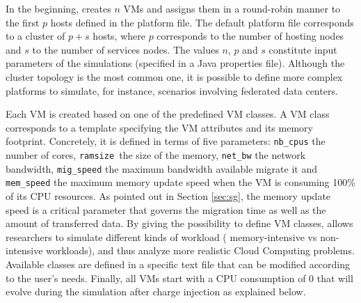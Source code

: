 In the beginning, \vmps creates $n$ VMs and assigns them in a
round-robin manner to the first $p$ hosts defined in the platform
file.  The default platform file corresponds to a cluster of $p+s$
hosts, where $p$ corresponds to the number of hosting nodes and $s$ to
the number of services nodes. The values $n$, $p$ and $s$ constitute
input parameters of the simulations (specified in a Java properties
file).
Although the cluster topology is the most
common one, it is possible to define more complex platforms to simulate,
for instance, scenarios involving federated data centers.

Each VM is created based on one of the predefined VM classes. A VM
class corresponds to a template specifying the VM attributes and its
memory footprint. Concretely, it is
defined in terms of five parameters:
\texttt{nb\_cpus}  the number of cores, \texttt{ramsize }the size of
the memory, \texttt{net\_bw} the
network bandwidth, \texttt{mig\_speed} the maximum
bandwidth available migrate it and \texttt{mem\_speed} the maximum
memory update speed when the VM is consuming 100\% of its CPU
resources. As pointed out in Section \ref{sec:sg}, the memory update speed is a critical parameter that
governs the migration time as well as the amount of transferred
data. By giving the possibility to define VM classes,
\vmps allows researchers to simulate different kinds of workload (\ie
memory-intensive vs non-intensive workloads), and thus analyze more
realistic Cloud Computing problems.
Available classes are
defined in a specific text file that can be modified according to the
user's needs.
%
Finally, all VMs start with a CPU consumption of 0 that will evolve during the
simulation after charge injection as explained below.

